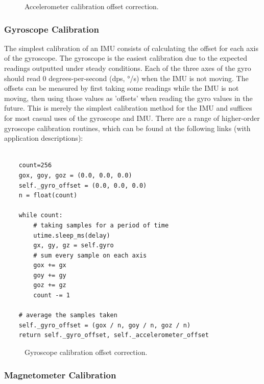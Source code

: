 \begin{figure}[!h]
  \centering
  \resizebox{1\linewidth}{!}{}
  \caption{Accelerometer calibration offset correction.}
\end{figure}

\subsubsection{Gyroscope Calibration}

The simplest calibration of an IMU consists of calculating the offset for each axis of the gyroscope. The gyroscope is the easiest calibration due to the expected readings outputted under steady conditions. Each of the three axes of the gyro should read 0 degrees-per-second (dps, °/s) when the IMU is not moving. The offsets can be measured by first taking some readings while the IMU is not moving, then using those values as 'offsets' when reading the gyro values in the future. This is merely the simplest calibration method for the IMU and suffices for most casual uses of the gyroscope and IMU. There are a range of  higher-order gyroscope calibration routines, which can be found at the following links (with application descriptions):

\lstset{language=Python}

\begin{lstlisting}[frame=single]  % Start your code-block

    count=256
    gox, goy, goz = (0.0, 0.0, 0.0)
    self._gyro_offset = (0.0, 0.0, 0.0) 
    n = float(count)

    while count:
        # taking samples for a period of time
        utime.sleep_ms(delay)
        gx, gy, gz = self.gyro
        # sum every sample on each axis
        gox += gx
        goy += gy
        goz += gz
        count -= 1

    # average the samples taken
    self._gyro_offset = (gox / n, goy / n, goz / n)
    return self._gyro_offset, self._accelerometer_offset
\end{lstlisting}

\begin{figure}[!h]
  \centering
  \resizebox{1\linewidth}{!}{}
  \caption{Gyroscope calibration offset correction.}
\end{figure}

\subsubsection{Magnetometer Calibration}

